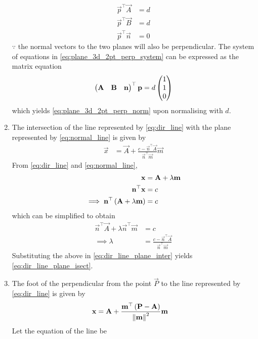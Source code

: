 \documentclass[journal,12pt,twocolumn]{IEEEtran}
\renewcommand\thesection{\arabic{section}}
\renewcommand\thesubsection{\thesection.\arabic{subsection}}
\begin{document}
\begin{enumerate}[label=\thesubsection.\arabic*.,ref=\thesubsection.\theenumi]
		\begin{align}
			\vec{p}^{\top}\vec{A} &=d 
			\\
			\vec{p}^{\top}\vec{B} &=d 
			\\
			\vec{p}^{\top}\vec{n} &= 0
			\label{eq:plane_3d_2pt_perp_system}
		\end{align}
		$\because$ the normal vectors to the two planes will also be perpendicular.  The system of equations in 
			\eqref{eq:plane_3d_2pt_perp_system}
			can be expressed as the matrix equation
		\begin{align}
			\begin{pmatrix}\mathbf{A} & \mathbf{B} & \mathbf{n}\end{pmatrix}^{\top}\mathbf{p} = d\begin{pmatrix}1 \\ 1 \\ 0\end{pmatrix}
			\label{eq:plane_3d_2pt_perp_system_temp}
		\end{align}
		which yields 
			\eqref{eq:plane_3d_2pt_perp_norm}
			upon normalising with $d$.
		\item The intersection of the line represented by 
	\eqref{eq:dir_line}
	with the plane represented by 
	\eqref{eq:normal_line}
	is given by 
\begin{align}
	\label{eq:dir_line_plane_isect}
	\vec{x} &= \vec{A} + \frac{c - \vec{n}^{\top}\vec{A}}{\vec{n}^{\top}\vec{m}}
\vec{m}
\end{align}
\solution From 
	\eqref{eq:dir_line}
	and 
	\eqref{eq:normal_line},
\begin{align}
	\mathbf{x} &= \mathbf{A} + \lambda \mathbf{m}
	\\
	\mathbf{n}^{\top}\mathbf{x} &= c
	\\
	\implies 
	\mathbf{n}^{\top}\left(\mathbf{A} + \lambda \mathbf{m}\right)&= c
	\label{eq:dir_line_plane_inter}
\end{align}
which can be simplified to obtain
\begin{align}
	\vec{n}^{\top}\vec{A} + \lambda 	\vec{n}^{\top}\vec{m}&= c
	\\
	\implies \lambda &= \frac{c - \vec{n}^{\top}\vec{A}}{\vec{n}^{\top}\vec{m}}
\end{align}
Substituting the above in 
	\eqref{eq:dir_line_plane_inter}
	yields
	\eqref{eq:dir_line_plane_isect}.
\item The foot of the perpendicular from the point $\vec{P}$ to the line  represented by 
	\eqref{eq:dir_line}
	is given by 
\begin{align}
	\label{eq:plane_line_foot_ans}
	\mathbf{x} &= \mathbf{A} + \frac{ \mathbf{m}^{\top}\left(\mathbf{P} - \mathbf{A}\right)}{\left\lVert\mathbf{m}\right\rVert^2}
\mathbf{m}
\end{align}
\solution  Let the equation of the line be 

\end{enumerate}
\end{document}
